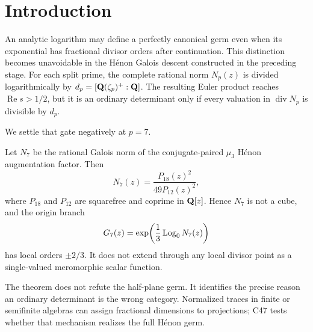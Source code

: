 \section{Introduction}

An analytic logarithm may define a perfectly canonical germ even when its
exponential has fractional divisor orders after continuation.  This
distinction becomes unavoidable in the H\'enon Galois descent constructed in
the preceding stage.  For each split prime, the complete rational norm
$N_p(z)$ is divided logarithmically by
$d_p=[\mathbf Q(\zeta_p)^+:\mathbf Q]$.  The resulting Euler product reaches
$\operatorname{Re}s>1/2$, but it is an ordinary determinant only if every
valuation in $\operatorname{div}N_p$ is divisible by $d_p$.

We settle that gate negatively at $p=7$.

\begin{theorem}\label{thm:main}
Let $N_7$ be the rational Galois norm of the conjugate-paired $\mu_3$ H\'enon
augmentation factor.  Then
\[
 N_7(z)=\frac{P_{18}(z)^2}{49P_{12}(z)^2},
\]
where $P_{18}$ and $P_{12}$ are squarefree and coprime in $\mathbf Q[z]$.  Hence
$N_7$ is not a cube, and the origin branch
\[
 G_7(z)=\exp\!\left(\frac13\operatorname{Log}_0 N_7(z)\right)
\]
has local orders $\pm2/3$.  It does not extend through any local divisor point
as a single-valued meromorphic scalar function.
\end{theorem}

The theorem does not refute the half-plane germ.  It identifies the precise
reason an ordinary determinant is the wrong category.  Normalized traces in
finite or semifinite algebras can assign fractional dimensions to
projections; C47 tests whether that mechanism realizes the full H\'enon germ.

